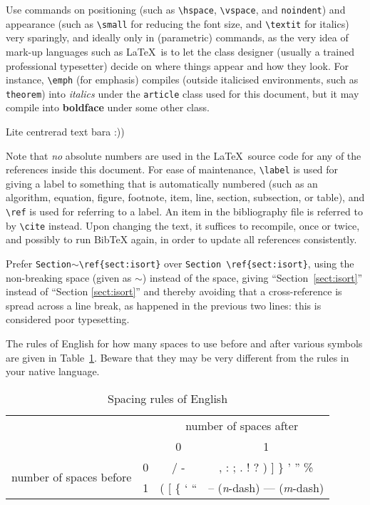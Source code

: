 \documentclass[a4paper,11pt]{article}
\begin{document}
Use commands on positioning (such as \verb|\hspace|, \verb|\vspace|,
and \verb|noindent|) and appearance (such as \verb|\small| for
reducing the font size, and \verb|\textit| for italics) very
sparingly, and ideally only in (parametric) commands, as the very idea
of mark-up languages such as \LaTeX\ is to let the class designer
(usually a trained professional typesetter) decide on where things
appear and how they look.  For instance, \verb|\emph| (for emphasis)
compiles (outside italicised environments, such as \texttt{theorem})
into \textit{italics} under the \texttt{article} class used for this
document, but it may compile into \textbf{boldface} under some other
class.
\begin{center}
  Lite centrerad text bara :))
\end{center}

Note that \emph{no} absolute numbers are used in the \LaTeX\ source
code for any of the references inside this document.  For ease of
maintenance, \verb|\label| is used for giving a label to something
that is automatically numbered (such as an algorithm, equation,
figure, footnote, item, line, section, subsection, or table), and
\verb|\ref| is used for referring to a label.  An item in the
bibliography file is referred to by \verb|\cite| instead.  Upon
changing the text, it suffices to recompile, once or twice, and
possibly to run BibTeX again, in order to update all references
consistently.

Prefer \verb|Section|$\sim$\verb|\ref{sect:isort}| over
\verb|Section \ref{sect:isort}|, using the non-breaking space (given
as $\sim$) instead of the space, giving ``Section~\ref{sect:isort}''
instead of ``Section \ref{sect:isort}'' and thereby avoiding that a
cross-reference is spread across a line break, as happened in the
previous two lines: this is considered poor typesetting.

The rules of English for how many spaces to use before and after
various symbols are given in Table~\ref{tab:spacing}.  Beware that
they may be very different from the rules in your native language.

\begin{table}[t]
  \centering
  \begin{tabular}{|c|c|c|c|}
    \cline{3-4}
    \multicolumn{2}{c|}{} & \multicolumn{2}{c|}{number of spaces after} \\
    \cline{3-4}
    \multicolumn{2}{c|}{} & 0 & 1 \\
    \hline
    \multirow{2}{*}{number of spaces before} & 0 & / - & , : ; . ! ?
    ) ] \} ' '' \% \\
    \cline{2-4}
    & 1 & ( [ \{ ` `` & -- (\emph{n}-dash) --- (\emph{m}-dash) \\
    \hline
  \end{tabular}
  \caption{Spacing rules of English}
  \label{tab:spacing}
\end{table}

\vfill
\end{document}
